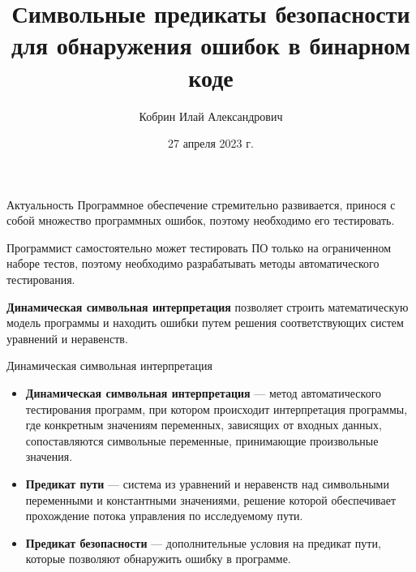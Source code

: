 \documentclass[10pt]{beamer}
\title{Символьные предикаты безопасности для обнаружения ошибок в бинарном коде}
\date{27 апреля 2023 г.}
\author{Кобрин Илай Александрович}
\institute{МГУ им. М.В. Ломоносова \\
Факультет вычислительной математики и кибернетики \\
Кафедра системного программирования}
\begin{document}
\maketitle

\begin{frame}{Актуальность}
Программное обеспечение стремительно развивается, принося с собой множество
программных ошибок, поэтому необходимо его тестировать.

Программист самостоятельно может тестировать ПО только на ограниченном наборе
тестов, поэтому необходимо разрабатывать методы автоматического тестирования.

\textbf{Динамическая символьная интерпретация} позволяет строить математическую
модель программы и находить ошибки путем решения соответствующих систем уравнений и неравенств.
\end{frame}

\begin{frame}{Динамическая символьная интерпретация}
\begin{itemize}
    \item \textbf{Динамическая символьная интерпретация} --- метод автоматического тестирования
        программ, при котором происходит интерпретация программы, где конкретным
        значениям переменных, зависящих от входных данных, сопоставляются
        символьные переменные, принимающие произвольные значения.
    \item \textbf{Предикат пути} --- система из уравнений и неравенств над
        символьными переменными и константными значениями, решение которой
        обеспечивает прохождение потока управления по исследуемому пути.
    \item \textbf{Предикат безопасности} --- дополнительные условия на предикат пути,
        которые позволяют обнаружить ошибку в программе.
\end{itemize}
\end{frame}
\end{document}
